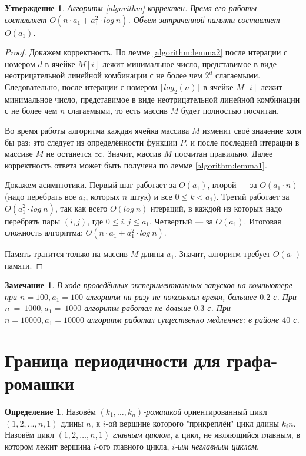 \documentclass[12pt]{article}
\newtheorem{proposition}[theorem]{Утверждение}
\newtheorem{remark}[theorem]{Замечание}
\theoremstyle{definition}
\newtheorem{definition}[theorem]{Определение}
\begin{document}
\begin{proposition}
Алгоритм \ref{algorithm} корректен. Время его работы составляет $O(n \cdot a_1 + a_1^2 \cdot log \ n)$. Объем затраченной памяти составляет $O(a_1)$.
\end{proposition}
\begin{proof}
Докажем корректность. По лемме \ref{algorithm:lemma2} после итерации с номером $d$ в ячейке $M[i]$ лежит минимальное число, представимое в виде неотрицательной линейной комбинации с не более чем $2^d$ слагаемыми. Следовательно, после итерации с номером $\lceil log_2(n) \rceil$ в ячейке $M[i]$ лежит минимальное число, представимое в виде неотрицательной линейной комбинации с не более чем $n$ слагаемыми, то есть массив $M$ будет полностью посчитан.

Во время работы алгоритма каждая ячейка массива $M$ изменит своё значение хотя бы раз: это следует из определённости функции $P$, и после последней итерации в массиве $M$ не останется $\infty$. Значит, массив $M$ посчитан правильно. Далее корректность ответа может быть получена по лемме \ref{algorithm:lemma1}.

Докажем асимптотики. Первый шаг работает за $O(a_1)$, второй --- за $O(a_1 \cdot n)$ (надо перебрать все $a_i$, которых $n$ штук) и все $0 \le k < a_1$). Третий работает за $O(a_1^2 \cdot log \ n)$, так как всего $O(log \ n)$ итераций, в каждой из которых надо перебрать пары $(i, j)$, где $0 \le i, j \le a_1$. Четвертый --- за $O(a_1)$. Итоговая сложность алгоритма: $O(n \cdot a_1 + a_1^2 \cdot log \ n)$.

Память тратится только на массив $M$ длины $a_1$. Значит, алгоритм требует $O(a_1)$ памяти.
\end{proof}

\begin{remark}
В ходе проведённых экспериментальных запусков на компьютере при $n = 100, a_1 = 100$ алгоритм ни разу не показывал время, большее $0.2$ с. При $n~=~1000, a_1 =~1000$ алгоритм работал не дольше $0.3$ с. При $n = 10000, a_1 = 10000$ алгоритм работал существенно медленнее: в районе $40$ с.
\end{remark}

\section{Граница периодичности для графа-ромашки}

\begin{definition}
Назовём $(k_1, \dots, k_n)$\textit{-ромашкой} ориентированный цикл $(1, 2, \dots, n, 1)$ длины $n$, к $i$-ой вершине которого "прикреплён" цикл длины $k_in$. Назовём цикл $(1, 2, \dots, n, 1)$ \textit{главным циклом}, а цикл, не являющийся главным, в котором лежит вершина $i$-ого главного цикла, \textit{$i$-ым неглавным циклом}.
\end{definition}
\end{document}
